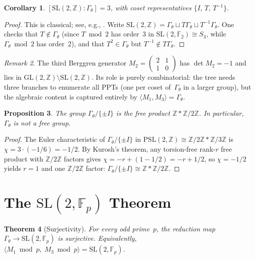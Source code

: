 \documentclass[12pt]{amsart}
\newtheorem{theorem}{Theorem}[section]
\newtheorem{proposition}[theorem]{Proposition}
\newtheorem{corollary}[theorem]{Corollary}
\theoremstyle{definition}
\theoremstyle{remark}
\newtheorem{remark}[theorem]{Remark}
\newcommand{\SL}{\mathrm{SL}}
\newcommand{\PSL}{\mathrm{PSL}}
\newcommand{\GL}{\mathrm{GL}}
\newcommand{\Fp}{\mathbb{F}_p}
\newcommand{\Z}{\mathbb{Z}}
\newcommand{\Gtheta}{\Gamma_\theta}
\begin{document}
\begin{corollary}\label{cor:index3}
$[\SL(2,\Z) : \Gtheta] = 3$, with coset representatives
$\{I,\, T,\, T^{-1}\}$.
\end{corollary}

\begin{proof}
This is classical; see, e.g., \cite{shimura}.  Write
$\SL(2,\Z) = \Gtheta \sqcup T\Gtheta \sqcup T^{-1}\Gtheta$.
One checks that $T \notin \Gtheta$ (since $T \bmod 2$ has order~3 in
$\SL(2,\mathbb{F}_2) \cong S_3$, while $\Gtheta \bmod 2$ has order~2),
and that $T^2 \in \Gtheta$ but $T^{-1} \notin T\Gtheta$.
\end{proof}

\begin{remark}\label{rmk:m2}
The third Berggren generator $M_2 = \left(\begin{smallmatrix}2&1\\1&0
\end{smallmatrix}\right)$ has $\det M_2 = -1$ and lies in
$\GL(2,\Z) \setminus \SL(2,\Z)$.  Its role is purely combinatorial:
the tree needs three branches to enumerate all PPTs (one per coset
of~$\Gtheta$ in a larger group), but the algebraic content is captured
entirely by $\langle M_1, M_3\rangle = \Gtheta$.
\end{remark}

\begin{proposition}\label{prop:free}
The group $\Gtheta/\{\pm I\}$ is the free product $\Z * \Z/2\Z$.
In particular, $\Gtheta$ is not a free group.
\end{proposition}

\begin{proof}
The Euler characteristic of $\Gtheta/\{\pm I\}$ in $\PSL(2,\Z) \cong
\Z/2\Z * \Z/3\Z$ is $\chi = 3 \cdot (-1/6) = -1/2$.  By Kurosh's
theorem, any torsion-free rank-$r$ free product with $\Z/2\Z$ factors
gives $\chi = -r + (1-1/2) = -r + 1/2$, so $\chi = -1/2$ yields $r=1$
and one $\Z/2\Z$ factor: $\Gtheta/\{\pm I\} \cong \Z * \Z/2\Z$.
\end{proof}


\section{The $\SL(2,\Fp)$ Theorem}\label{sec:sl2fp}

\begin{theorem}[Surjectivity]\label{thm:surjective}
For every odd prime~$p$, the reduction map
$\Gtheta \to \SL(2,\Fp)$ is surjective.  Equivalently,
$\langle M_1 \bmod p,\; M_3 \bmod p\rangle = \SL(2,\Fp)$.
\end{theorem}
\end{document}
